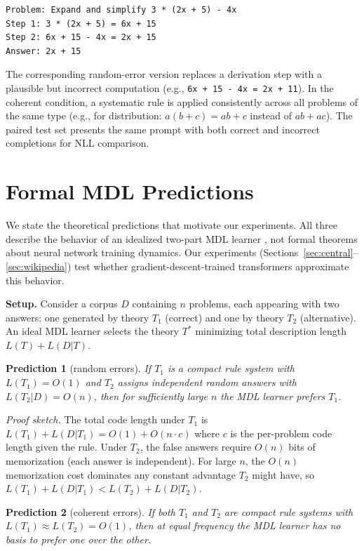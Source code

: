 \documentclass{article}
\begin{document}
\begin{verbatim}
Problem: Expand and simplify 3 * (2x + 5) - 4x
Step 1: 3 * (2x + 5) = 6x + 15
Step 2: 6x + 15 - 4x = 2x + 15
Answer: 2x + 15
\end{verbatim}

The corresponding random-error version replaces a derivation step with a plausible but incorrect computation (e.g., \texttt{6x + 15 - 4x = 2x + 11}). In the coherent condition, a systematic rule is applied consistently across all problems of the same type (e.g., for distribution: $a(b+c) = ab + c$ instead of $ab + ac$). The paired test set presents the same prompt with both correct and incorrect completions for NLL comparison.

\section{Formal MDL Predictions}
\label{app:mdl}

We state the theoretical predictions that motivate our experiments. All three describe the behavior of an idealized two-part MDL learner \citep{rissanen1978modeling,grunwald2007minimum}, not formal theorems about neural network training dynamics. Our experiments (Sections~\ref{sec:central}--\ref{sec:wikipedia}) test whether gradient-descent-trained transformers approximate this behavior.

\textbf{Setup.} Consider a corpus $D$ containing $n$ problems, each appearing with two answers: one generated by theory $T_1$ (correct) and one by theory $T_2$ (alternative). An ideal MDL learner selects the theory $T^*$ minimizing total description length $L(T) + L(D|T)$.

\textbf{Prediction 1} (random errors). \emph{If $T_1$ is a compact rule system with $L(T_1) = O(1)$ and $T_2$ assigns independent random answers with $L(T_2|D) = O(n)$, then for sufficiently large $n$ the MDL learner prefers $T_1$.}

\emph{Proof sketch.} The total code length under $T_1$ is $L(T_1) + L(D|T_1) = O(1) + O(n \cdot c)$ where $c$ is the per-problem code length given the rule. Under $T_2$, the false answers require $O(n)$ bits of memorization (each answer is independent). For large $n$, the $O(n)$ memorization cost dominates any constant advantage $T_2$ might have, so $L(T_1) + L(D|T_1) < L(T_2) + L(D|T_2)$.

\textbf{Prediction 2} (coherent errors). \emph{If both $T_1$ and $T_2$ are compact rule systems with $L(T_1) \approx L(T_2) = O(1)$, then at equal frequency the MDL learner has no basis to prefer one over the other.}
\end{document}
